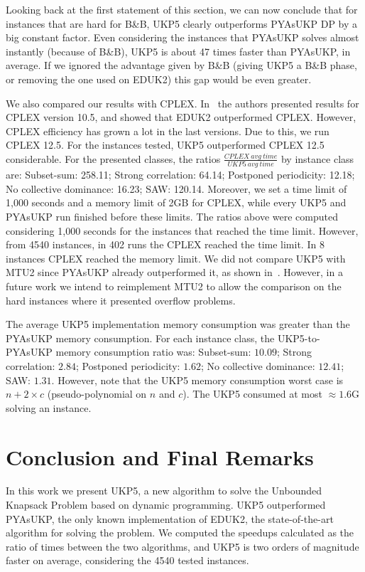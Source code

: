 \documentclass[runningheads,a4paper]{llncs}
\begin{document}
Looking back at the first statement of this section, we can now conclude that for instances that are hard for B\&B, UKP5 clearly outperforms PYAsUKP DP by a big constant factor. 
Even considering the instances that PYAsUKP solves almost instantly (because of B\&B), UKP5 is about 47 times faster than PYAsUKP, in average. 
If we ignored the advantage given by B\&B (giving UKP5 a B\&B phase, or removing the one used on EDUK2) this gap would be even greater.

We also compared our results with CPLEX.
In~\cite{pya} the authors presented results for CPLEX version 10.5, and showed that EDUK2 outperformed CPLEX.
However, CPLEX efficiency has grown a lot in the last versions. Due to this, we run CPLEX 12.5.
For the instances tested, UKP5 outperformed CPLEX 12.5 considerable.
For the presented classes, the ratios $\frac{CPLEX~avg~time}{UKP5~avg~time}$ by instance class are: 
Subset-sum: 258.11; Strong correlation: 64.14; Postponed periodicity: 12.18; No collective dominance: 16.23; SAW: 120.14. 
Moreover, we set a time limit of 1,000 seconds and a memory limit of 2GB for CPLEX, while every UKP5 and PYAsUKP run finished before these limits.
The ratios above were computed considering 1,000 seconds for the instances that reached the time limit.
However, from 4540 instances, in 402 runs the CPLEX reached the time limit.
In 8 instances CPLEX reached the memory limit. 
We did not compare UKP5 with MTU2 since PYAsUKP already outperformed it, as shown in~\cite{pya}.
However, in a future work we intend to reimplement MTU2 to allow the comparison on the hard instances where it presented overflow problems.

The average UKP5 implementation memory consumption was greater than the PYAsUKP memory consumption. For each instance class, the UKP5-to-PYAsUKP memory consumption ratio was: Subset-sum: \(10.09\); Strong correlation: \(2.84\); Postponed periodicity: \(1.62\); No collective dominance: \(12.41\); SAW: \(1.31\). 
However, note that the UKP5 memory consumption worst case is \(n + 2\times c\) (pseudo-polynomial on \(n\) and \(c\)). 
The UKP5 consumed at most \(\approx 1.6\)G solving an instance.

\section{Conclusion and Final Remarks}

In this work we present UKP5, a new algorithm to solve the Unbounded Knapsack Problem based on dynamic programming.
UKP5 outperformed PYAsUKP, the only known implementation of EDUK2, the state-of-the-art algorithm for solving the problem.
We computed the speedups calculated as the ratio of times between the two algorithms, and UKP5 is two orders of magnitude faster on average, considering the 4540 tested instances.
\end{document}
